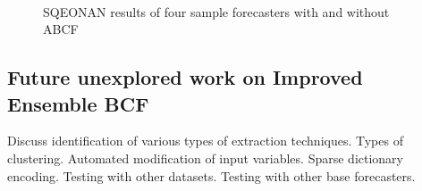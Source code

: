 \begin{figure}[!ht]
	\begin{center}
		 \\
	\end{center}
	\caption{SQEONAN results of four sample forecasters with and without ABCF}
	\label{fig:sqe_results}
\end{figure}



\subsection{Future unexplored work on Improved Ensemble BCF}
Discuss identification of various types of extraction techniques.  Types of clustering.  Automated modification of input variables. Sparse dictionary encoding.  Testing with other datasets.  Testing with other base forecasters.

